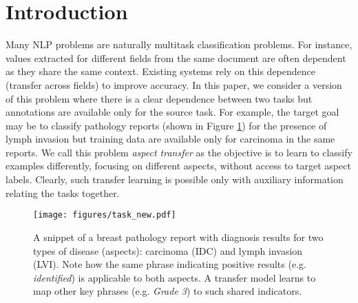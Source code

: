 \section{Introduction}

Many NLP problems are naturally multitask classification problems. For instance, values extracted for different fields from the same document are often dependent as they share the same context. Existing systems rely on this dependence (transfer across fields) to improve accuracy. In this paper, we consider a version of this problem where there is a clear dependence between two tasks but annotations are available only for the source task. For example, the target goal may be to classify pathology reports (shown in Figure \ref{fig:pathology}) for the presence of lymph invasion but training data are available only for carcinoma in the same reports. We call this problem \emph{aspect transfer} as the objective is to learn to classify examples differently, focusing on different aspects, without access to target aspect labels. Clearly, such transfer learning is possible only with auxiliary information relating the tasks together. 

\iffalse
In this paper, we consider multitask classification from a different angle. Specifically, we assume that annotations are provided for a single task but not available for other tasks. The goal is to utilize these available source annotations to build a classifier for a target task.  We call this problem ``aspect transfer'' as the two classification tasks can be thought to pertain to different aspects of the same document. For example, the target goal may be to classify pathology reports (shown in Figure \ref{fig:pathology}) for the presence of lymph invasion but the available training data involve only annotations for carcinoma in the same reports. This problem is a special case of transfer learning where both source and target classifiers operate over the same document -- in the example above, pathology reports.
\fi


\begin{figure}[t]
\centering
 \texttt{[image: figures/task\_new.pdf]}
\caption{A snippet of a breast pathology report with diagnosis results for two types of disease (aspects): carcinoma (IDC) and lymph invasion (LVI). Note how the same phrase indicating positive results (e.g. \emph{identified}) is applicable to both aspects.
A transfer model learns to map other key phrases (e.g. \emph{Grade 3}) to such shared indicators.
}\label{fig:pathology}
\end{figure}

